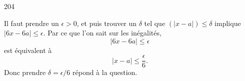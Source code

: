 

\begin{corrige}{204}

Il faut prendre un $\epsilon>0$, et puis trouver un $\delta$ tel que $(| x- a |)\leq\delta$ implique $ | 6x-6a |\leq\epsilon$. Par ce que l'on sait sur les inégalités, 
\[ 
  | 6x-6a |\leq\epsilon
\]
 est équivalent à
\[ 
  | x-a |\leq \frac{ \epsilon }{ 6 }.
\]
Donc prendre $\delta=\epsilon/6$ répond à la question.

\end{corrige}
